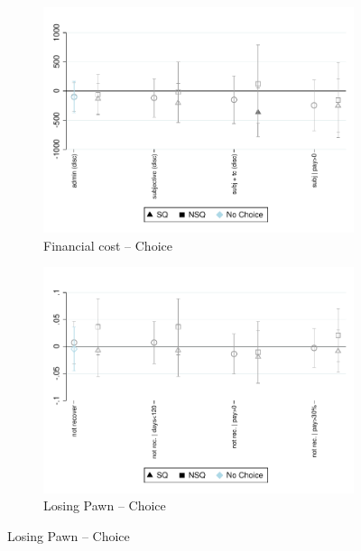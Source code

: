 \documentclass[11pt]{article}
\begin{document}
\begin{figure}[H]
    \caption{The effect of choice between promise-commitment and status quo}
    \label{fc_pro5}
    \begin{center}
    \begin{subfigure}{0.45\textwidth}
        \caption{Financial cost -- Choice}
        \centering
        \includegraphics[width=\textwidth]{Figuras/fc_te_pro_5.pdf}
    \end{subfigure}
    \begin{subfigure}{0.45\textwidth}
        \caption{Losing Pawn -- Choice}
        \centering
        \includegraphics[width=\textwidth]{Figuras/def_te_pro_5.pdf}
    \end{subfigure}
    

\end{center}
\end{figure}
\end{document}
